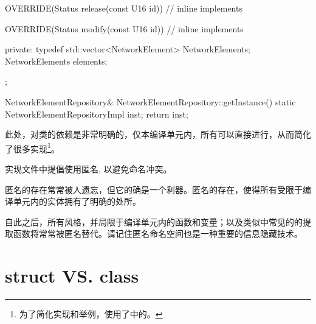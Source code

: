 \begin{content}
\begin{leftbar}
\begin{c++}[caption={ne/NetworkElementRepository.cpp}]
{{        OVERRIDE(Status release(const U16 id))
        {
            // inline implements
        }

        OVERRIDE(Status modify(const U16 id))
        {
            // inline implements
        }
    
    private:
        typedef std::vector<NetworkElement> NetworkElements;
        NetworkElements elements;
    };
}

NetworkElementRepository& NetworkElementRepository::getInstance()
{
    static NetworkElementRepositoryImpl inst;
    return inst;
}
\end{c++}
\end{leftbar}

此处，对类的依赖是非常明确的，仅本编译单元内，所有可以直接进行，从而简化了很多实现\footnote{为了简化实现和举例，使用了中的。}。

\begin{regulation}
实现文件中提倡使用匿名, 以避免命名冲突。
\end{regulation}

匿名的存在常常被人遗忘，但它的确是一个利器。匿名的存在，使得所有受限于编译单元内的实体拥有了明确的处所。

自此之后，所有\clang{}风格，并局限于编译单元内的函数和变量；以及类似中常见的的提取函数将常常被匿名替代。请记住匿名命名空间也是一种重要的信息隐藏技术。

\end{content}

\section{struct VS. class}

